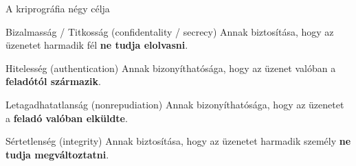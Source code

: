 \documentclass[12 pt]{beamer}
\newcommand{\tanedo}{tanedolight}		%
\newcommand{\Comment}[1]{\textcolor{Comment}{\footnotesize{#1}\normalsize}} %
\begin{document}
{\begin{frame}[c]
\begin{center}
    \end{center}
  \end{frame}
  }


\begin{frame}{A kriprográfia négy célja}

  \begin{block}{Bizalmasság / Titkosság (confidentality / secrecy)}
    Annak biztosítása, hogy az üzenetet harmadik fél \textbf{ne tudja elolvasni}.
  \end{block}

  \begin{block}{Hitelesség (authentication)}
    Annak bizonyíthatósága, hogy az üzenet valóban a \textbf{feladótól származik}.
  \end{block}

  \begin{block}{Letagadhatatlanság (nonrepudiation)}
    Annak bizonyíthatósága, hogy az üzenetet a \textbf{feladó valóban elküldte}.
  \end{block}

  \begin{block}{Sértetlenség (integrity)}
    Annak biztosítása, hogy az üzenetet harmadik személy \textbf{ne tudja megváltoztatni}.
  \end{block}
  
\end{frame}

\end{document}
